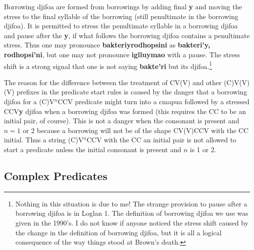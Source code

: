 \documentclass[12pt]{book}
\begin{document}
{Borrowing djifoa are formed from borrowings by adding final {\bf y} and moving the stress to the final syllable of the borrowing (still penultimate in the borrowing djifoa).  It is permitted to stress the penultimate syllable in a borrowing djifoa and pause after the {\bf y}, if what follows the borrowing djifoa contains a penultimate stress.  Thus
one may pronounce {\bf bakteriyrodhopsini} as {\bf bakteri'y, rodhopsi'ni}, but one may not pronounce {\bf iglluymao} with a pause.  The stress shift is a strong signal that one
is not saying {\bf bakte'ri} but its djifoa.\footnote{Nothing in this situation is due to me!  The strange provision to pause after a borrowing djifoa is in Loglan 1.  The definition of borrowing djifoa we use was given in the 1990's.  I do not know if anyone noticed the stress shift caused by the change in the definition of borrowing djifoa, but it is all a logical consequence of the way things stood at Brown's death.}

The reason for the difference between the treatment of CV(V) and other (C)V(V)(V) prefixes in the predicate start rules  is caused by the danger that a borrowing djifoa for a (C)V$^n$CCV predicate might turn into a cmapua followed
by a stressed CCV{\bf y} djifoa when a borrowing djifoa was formed (this requires the CC to be an initial pair, of course).  This is not a danger when the consonant is present and $n = 1$ or 2 because a borrowing will not be of the shape
CV(V)CCV with the CC initial.  Thus a string (C)V$^n$CCV with the CC an initial pair is not allowed to start a predicate unless the initial consonant is present and $n$ is 1 or 2.

\subsection{Complex Predicates}

}
\end{document}

